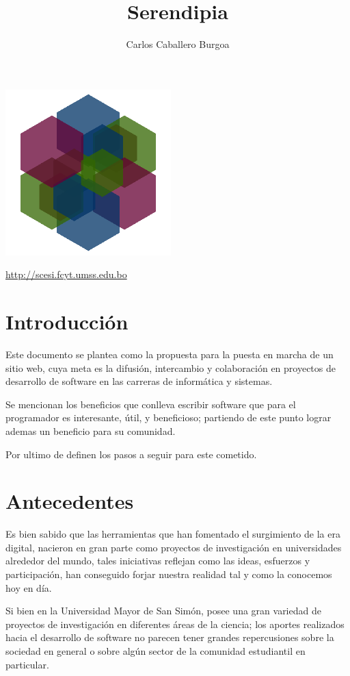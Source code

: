 \documentclass[letter,12pt]{article}
\title{\bf Serendipia}
\author{Carlos Caballero Burgoa}
\begin{document}
\maketitle
\begin{center}\includegraphics[width=0.48\textwidth]{serendipia.png}\end{center}
\begin{center}\url {http://scesi.fcyt.umss.edu.bo}\end{center}
\pagebreak

\tableofcontents
\pagebreak

\section{Introducción}
Este documento se plantea como la propuesta para la puesta en marcha de un sitio web, cuya meta
es la difusión, intercambio y colaboración en proyectos de desarrollo de software en las carreras
de informática y sistemas.

Se mencionan los beneficios que conlleva escribir software que para el programador es interesante,
útil, y beneficioso; partiendo de este punto lograr ademas un beneficio para su comunidad.

Por ultimo de definen los pasos a seguir para este cometido.

\section{Antecedentes}
Es bien sabido que las herramientas que han fomentado el surgimiento de la era digital, nacieron
en gran parte como proyectos de investigación en universidades alrededor del mundo, tales
iniciativas reflejan como las ideas, esfuerzos y participación, han conseguido forjar nuestra
realidad tal y como la conocemos hoy en día.

Si bien en la Universidad Mayor de San Simón, posee una gran variedad de proyectos de investigación
en diferentes áreas de la ciencia; los aportes realizados hacia el desarrollo de software no
parecen tener grandes repercusiones sobre la sociedad en general o sobre algún sector de la
comunidad estudiantil en particular.
\end{document}
